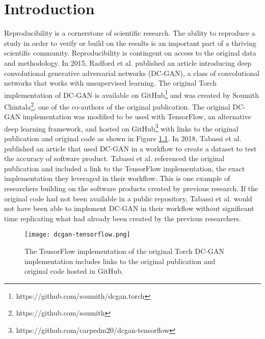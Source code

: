 \chapter{Introduction}
\label{ch:introduction}


Reproducibility is a cornerstone of scientific research. The ability to reproduce a study in order to verify or build on the results is an important part of a thriving scientific community. Reproducibility is contingent on access to the original data and methodology. In 2015, Radford et al. published an article introducing deep convolutional generative adversarial networks (DC-GAN), a class of convolutional networks that works with unsupervised learning. The original Torch implementation of DC-GAN is available on GitHub\footnote{https://github.com/soumith/dcgan.torch} and was created by Soumith Chintala\footnote{https://github.com/soumith}, one of the co-authors of the original publication. The original DC-GAN implementation was modified to be used with TensorFlow, an alternative deep learning framework, and hosted on GitHub\footnote{https://github.com/carpedm20/dcgan-tensorflow} with links to the original publication and original code as shown in Figure \ref{fig:dcgan-tensorflow}. In 2018, Tabassi et al. published an article that used DC-GAN in a workflow to create a dataset to test the accuracy of software product. Tabassi et al. referenced the original publication and included a link to the TensorFlow implementation, the exact implementation they leveraged in their workflow. This is one example of researchers building on the software products created by previous research. If the original code had not been available in a public repository, Tabassi et al. would not have been able to implement DC-GAN in their workflow without significant time replicating what had already been created by the previous researchers. 

\begin{figure}
    \centering
    \texttt{[image: dcgan-tensorflow.png]}
    \caption{The TensorFlow implementation of the original Torch DC-GAN implementation includes links to the original publication and original code hosted in GitHub.}
    \label{fig:dcgan-tensorflow}
\end{figure}


